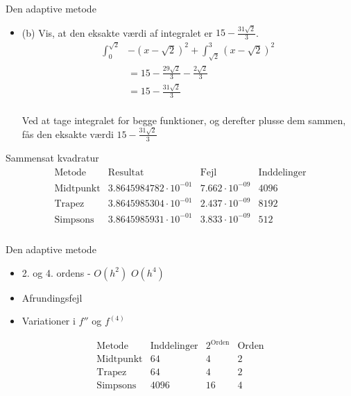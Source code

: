 \begin{frame}{Den adaptive metode}
    \begin{itemize}
        \item (b) Vis, at den eksakte værdi af integralet er $15-\frac{31\sqrt{2}}{3}$.
\begin{align*}
\int^{\sqrt{2}}_0 &-(x-\sqrt{2})^2+\int^3_{\sqrt{2}}(x-\sqrt{2})^2\\
&=15-\frac{29\sqrt{2}}{3}-\frac{2\sqrt{2}}{3} \\
&=15-\frac{31\sqrt{2}}{3} 
\end{align*} \\
            Ved at tage integralet for begge funktioner, og derefter plusse dem sammen, fås den eksakte værdi $15-\frac{31\sqrt{2}}{3}$ \\
    \end{itemize}
\end{frame}



\begin{frame}{Sammensat kvadratur}
\begin{align*}
\begin{array}{l|c|c|c}
\text{Metode} & \text{Resultat}& \text{Fejl} &  \text{Inddelinger} \\
\hline
\text{Midtpunkt}	& 3.8645984782 \cdot 10^{-01} & 7.662 \cdot 10^{-09}	& 4096 \\
\text{Trapez}		& 3.8645985304 \cdot 10^{-01} & 2.437 \cdot 10^{-09} & 8192 \\
\text{Simpsons}		& 3.8645985931 \cdot 10^{-01} & 3.833 \cdot 10^{-09} & 512 \\
\end{array}
\end{align*}
\end{frame}

\begin{frame}{Den adaptive metode}
    \begin{itemize}
        \item 2. og 4. ordens - $O(h^2)$ $O(h^4)$
        \item Afrundingsfejl
        \item Variationer i $f''$ og $f^{(4)}$
    \end{itemize}
    
$$\begin{array}{l|c|c|c}
\text{Metode} & \text{Inddelinger}& 2^\text{Orden} & \text{Orden}\\
\hline
\text{Midtpunkt}	& 64		& 4 	&2\\
\text{Trapez}		& 64		& 4 	&2\\
\text{Simpsons}		& 4096		& 16 	&4\\
\end{array}$$
\end{frame}



